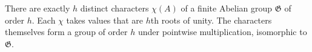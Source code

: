 There are exactly $h$ distinct characters $\chi(A)$ of a finite Abelian group $\mathfrak{G}$ of order $h$. Each $\chi$ takes values that are $h$th roots of unity. The characters themselves form a group of order $h$ under pointwise multiplication, isomorphic to $\mathfrak{G}$.
